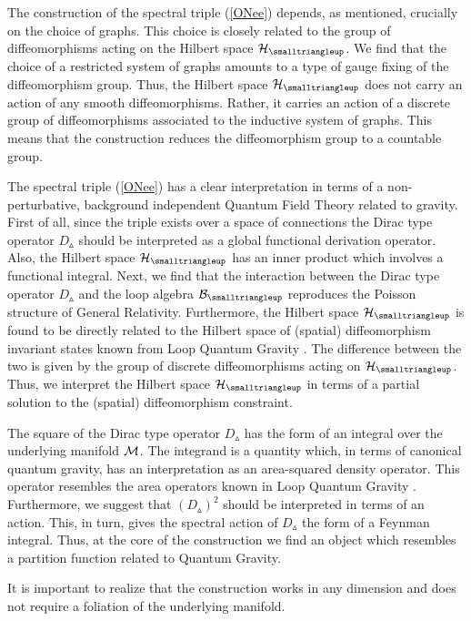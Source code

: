 \documentclass[12pt]{article}
\def\cb{{\cal B}}
\def\ch{{\cal H}}
\def\cm{{\cal M}}
\begin{document}
The construction of the spectral triple (\ref{ONee}) depends, as mentioned, crucially on the choice of graphs. This choice is closely related to the group of diffeomorphisms acting on the Hilbert space $\ch_\smalltriangleup$. We find that the choice of a restricted system of graphs amounts to a type of gauge fixing of the diffeomorphism group. Thus, the Hilbert space $\ch_\smalltriangleup$ does not carry an action of any smooth diffeomorphisms. Rather, it carries an action of a discrete group of diffeomorphisms associated to the inductive system of graphs. This means that the construction reduces the diffeomorphism group to a countable group. 


The spectral triple (\ref{ONee}) has a clear interpretation in terms of a non-perturbative, background independent Quantum Field Theory related to gravity. First of all, since the triple exists over a space of connections the Dirac type operator $D_\smalltriangleup$ should be interpreted as a global functional derivation operator. Also, the Hilbert space $\ch_\smalltriangleup$ has an inner product which involves a functional integral.
Next, we find that the interaction between the Dirac type operator $D_\smalltriangleup$ and the loop algebra $\cb_\smalltriangleup$ reproduces the Poisson structure of General Relativity. Furthermore, the Hilbert space $\ch_\smalltriangleup$ is found to be directly related to the Hilbert space of (spatial) diffeomorphism invariant states known from Loop Quantum Gravity \cite{Fairbairn:2004qe}. The difference between the two is given by the group of discrete diffeomorphisms acting on $\ch_\smalltriangleup$. Thus, we interpret the Hilbert space $\ch_\smalltriangleup$ in terms of a partial solution to the (spatial) diffeomorphism constraint. 




The square of the Dirac type operator $D_\smalltriangleup$ has the form of an integral over the underlying manifold $
\cm$. The integrand is a quantity which, in terms of canonical quantum gravity, has an interpretation as an area-squared density operator. This operator resembles the area operators known in Loop Quantum Gravity \cite{Ashtekar:1996eg}. Furthermore, we suggest that $(D_\smalltriangleup)^2$ should be interpreted in terms of an action. This, in turn, gives the spectral action of $D_\smalltriangleup$ the form of a Feynman integral. Thus, at the core of the construction we find an object which resembles a partition function related to Quantum Gravity.


It is important to realize that the construction works in any dimension and does not require a foliation of the underlying manifold. 
\end{document}
